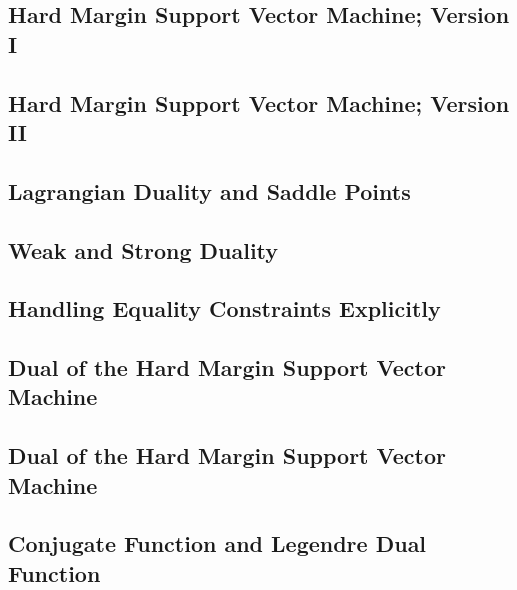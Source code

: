 \documentclass[a4paper]{article}
\begin{document}
\subsection{ Hard Margin Support Vector Machine; Version I} %

\subsection{ Hard Margin Support Vector Machine; Version II} %

\subsection{ Lagrangian Duality and Saddle Points} %

\subsection{ Weak and Strong Duality} %

\subsection{ Handling Equality Constraints Explicitly} %

\subsection{ Dual of the Hard Margin Support Vector Machine} %

\subsection{ Dual of the Hard Margin Support Vector Machine} %

\subsection{ Conjugate Function and Legendre Dual Function} %
\end{document}
